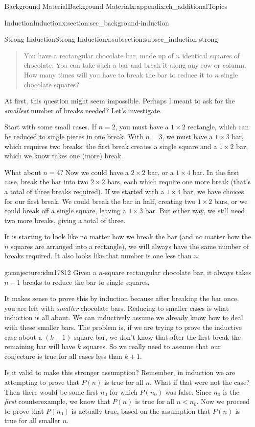 \documentclass[oneside,10pt,]{book}
\numberwithin{equation}{chapter}
\newcommand{\lt}{<}
\begin{document}
\begin{appendixptx}{Background Material}{}{Background Material}{}{}{x:appendix:ch_additionalTopics}
\begin{sectionptx}{Induction}{}{Induction}{}{}{x:section:sec_background-induction}
\begin{subsectionptx}{Strong Induction}{}{Strong Induction}{}{}{x:subsection:subsec_induction-strong}
\begin{quote}%
You have a rectangular chocolate bar, made up of \(n\) identical squares of chocolate.  You can take such a bar and break it along any row or column.  How many times will you have to break the bar to reduce it to \(n\) single chocolate squares?%
\end{quote}
At first, this question might seem impossible.  Perhaps I meant to ask for the \emph{smallest} number of breaks needed?  Let's investigate.%
\par
Start with some small cases.  If \(n=2\), you must have a \(1\times 2\) rectangle, which can be reduced to single pieces in one break.  With \(n=3\), we must have a \(1\times 3\) bar, which requires two breaks: the first break creates a single square and a \(1\times 2\) bar, which we know takes one (more) break.%
\par
What about \(n=4\)?  Now we could have a \(2\times 2\) bar, or a \(1 \times 4\) bar.  In the first case, break the bar into two \(2\times 2\) bars, each which require one more break (that's a total of three breaks required).  If we started with a \(1 \times 4\) bar, we have choices for our first break.  We could break the bar in half, creating two \(1\times 2\) bars, or we could break off a single square, leaving a \(1\times 3\) bar.  But either way, we still need two more breaks, giving a total of three.%
\par
It is starting to look like no matter how we break the bar (and no matter how the \(n\) squares are arranged into a rectangle), we will always have the same number of breaks required.  It also looks like that number is one less than \(n\):%
\begin{conjecture}{}{}{g:conjecture:idm17812}%
Given a \(n\)-square rectangular chocolate bar, it always takes \(n-1\) breaks to reduce the bar to single squares.%
\end{conjecture}
It makes sense to prove this by induction because after breaking the bar once, you are left with \emph{smaller} chocolate bars.  Reducing to smaller cases is what induction is all about.  We can inductively assume we already know how to deal with these smaller bars.  The problem is, if we are trying to prove the inductive case about a \((k+1)\)-square bar, we don't know that after the first break the remaining bar will have \(k\) squares.  So we really need to assume that our conjecture is true for all cases less than \(k+1\).%
\par
Is it valid to make this stronger assumption?  Remember, in induction we are attempting to prove that \(P(n)\) is true for all \(n\).  What if that were not the case?  Then there would be some first \(n_0\) for which \(P(n_0)\) was false.  Since \(n_0\) is the \emph{first} counterexample, we know that \(P(n)\) is true for all \(n \lt n_0\).  Now we proceed to prove that \(P(n_0)\) is actually true, based on the assumption that \(P(n)\) is true for all smaller \(n\).%

\end{subsectionptx}
\end{sectionptx}
\end{appendixptx}
\end{document}
